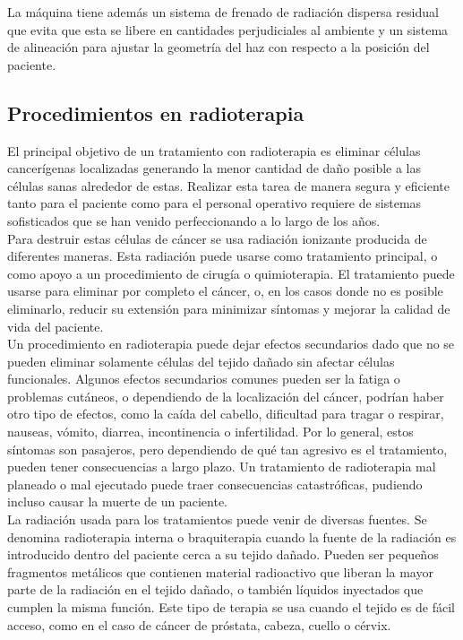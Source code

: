 La máquina tiene además un sistema de frenado de radiación dispersa residual que evita que esta se libere en cantidades perjudiciales al ambiente y un sistema de alineación para ajustar la geometría del haz con respecto a la posición del paciente\cite{Klein2009}.\\



\subsection{Procedimientos en radioterapia}

El principal objetivo de un tratamiento con radioterapia es eliminar células cancerígenas localizadas generando la menor cantidad de daño posible a las células sanas alrededor de estas. Realizar esta tarea de manera segura y eficiente tanto para el paciente como para el personal operativo requiere de sistemas sofisticados que se han venido perfeccionando a lo largo de los años\cite{cancer.net_2020}\cite{radioterapia}.\\

Para destruir estas células de cáncer se usa radiación ionizante producida de diferentes maneras. Esta radiación puede usarse como tratamiento principal, o como apoyo a un procedimiento de cirugía o quimioterapia. El tratamiento puede usarse para eliminar por completo el cáncer, o, en los casos donde no es posible eliminarlo, reducir su extensión para minimizar síntomas y mejorar la calidad de vida del paciente.\\

Un procedimiento en radioterapia puede dejar efectos secundarios dado que no se pueden eliminar solamente células del tejido dañado sin afectar células funcionales. Algunos efectos secundarios comunes pueden ser la fatiga o problemas cutáneos, o dependiendo de la localización del cáncer, podrían haber otro tipo de efectos, como la caída del cabello, dificultad para tragar o respirar, nauseas, vómito, diarrea, incontinencia o infertilidad\cite{symonds2019walter}. Por lo general, estos síntomas son pasajeros, pero dependiendo de qué tan agresivo es el tratamiento, pueden tener consecuencias a largo plazo. Un tratamiento de radioterapia mal planeado o mal ejecutado puede traer consecuencias catastróficas, pudiendo incluso causar la muerte de un paciente\cite{symonds2019walter}.\\

La radiación usada para los tratamientos puede venir de diversas fuentes. Se denomina radioterapia interna o braquiterapia cuando la fuente de la radiación es introducido dentro del paciente cerca a su tejido dañado. Pueden ser pequeños fragmentos metálicos que contienen material radioactivo que liberan la mayor parte de la radiación en el tejido dañado, o también líquidos inyectados que cumplen la misma función. Este tipo de terapia se usa cuando el tejido es de fácil acceso, como en el caso de cáncer de próstata, cabeza, cuello o cérvix.\\

